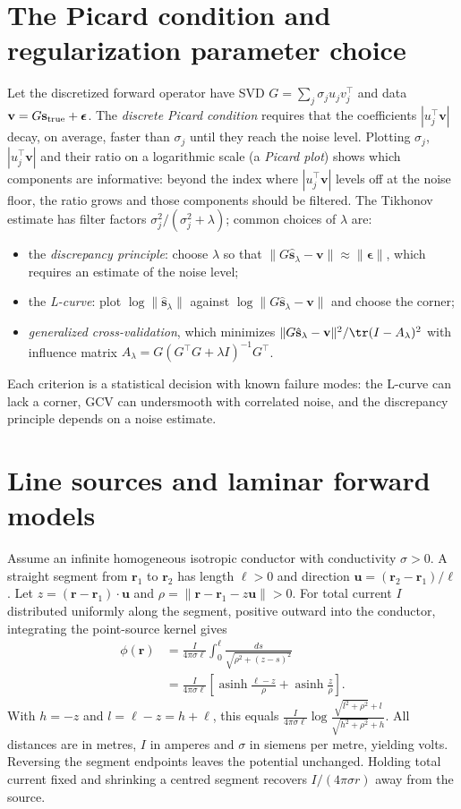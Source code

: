\section{The Picard condition and regularization parameter choice}
Let the discretized forward operator have SVD $G=\sum_j\sigma_ju_jv_j^\top$
and data $\mathbf v=G\mathbf s_{\rm true}+\boldsymbol\epsilon$. The
\emph{discrete Picard condition} requires that the coefficients
$|u_j^\top\mathbf v|$ decay, on average, faster than $\sigma_j$ until they
reach the noise level. Plotting $\sigma_j$, $|u_j^\top\mathbf v|$ and
their ratio on a logarithmic scale (a \emph{Picard plot}) shows which
components are informative: beyond the index where
$|u_j^\top\mathbf v|$ levels off at the noise floor, the ratio grows
and those components should be filtered. The Tikhonov estimate has
filter factors $\sigma_j^2/(\sigma_j^2+\lambda)$; common choices of
$\lambda$ are:
\begin{itemize}[leftmargin=2em]
\item the \emph{discrepancy principle}: choose $\lambda$ so that
$\|G\hat{\mathbf s}_\lambda-\mathbf v\|\approx\|\boldsymbol\epsilon\|$,
which requires an estimate of the noise level;
\item the \emph{L-curve}: plot $\log\|\hat{\mathbf s}_\lambda\|$ against
$\log\|G\hat{\mathbf s}_\lambda-\mathbf v\|$ and choose the corner;
\item \emph{generalized cross-validation}, which minimizes
$\|G\hat{\mathbf s}_\lambda-\mathbf v\|^2/\tr(I-A_\lambda)^2$ with
influence matrix $A_\lambda=G(G^\top G+\lambda I)^{-1}G^\top$.
\end{itemize}
Each criterion is a statistical decision with known failure modes: the
L-curve can lack a corner, GCV can undersmooth with correlated noise,
and the discrepancy principle depends on a noise estimate.

\section{Line sources and laminar forward models}
Assume an infinite homogeneous isotropic conductor with conductivity
$\sigma>0$. A straight segment from $\mathbf r_1$ to $\mathbf r_2$ has
length $\ell>0$ and direction $\mathbf u=(\mathbf r_2-\mathbf r_1)/\ell$.
Let $z=(\mathbf r-\mathbf r_1)\cdot\mathbf u$ and
$\rho=\|\mathbf r-\mathbf r_1-z\mathbf u\|>0$.
For total current $I$ distributed uniformly along the segment,
positive outward into the conductor, integrating the point-source kernel gives
\[
\begin{aligned}
\phi(\mathbf r)
&=\frac{I}{4\pi\sigma\ell}\int_0^\ell
 \frac{ds}{\sqrt{\rho^2+(z-s)^2}}\\
&=\frac{I}{4\pi\sigma\ell}
 \left[\operatorname{asinh}\frac{\ell-z}{\rho}
       +\operatorname{asinh}\frac{z}{\rho}\right].
\end{aligned}
\]
With $h=-z$ and $l=\ell-z=h+\ell$, this equals
$\frac{I}{4\pi\sigma\ell}
\log\frac{\sqrt{l^2+\rho^2}+l}{\sqrt{h^2+\rho^2}+h}$.
All distances are in metres, $I$ in amperes and $\sigma$ in siemens per
metre, yielding volts. Reversing the segment endpoints leaves the potential
unchanged. Holding total current fixed and shrinking a centred segment
recovers $I/(4\pi\sigma r)$ away from the source.

